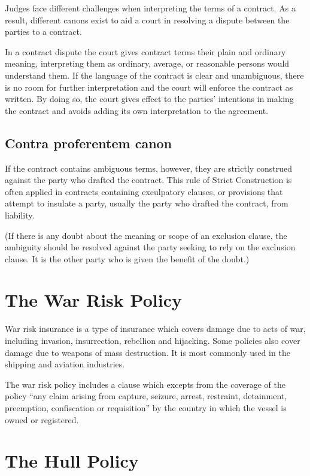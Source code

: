 
Judges face different challenges when interpreting the terms of a contract. As a result, different canons exist to aid a court in resolving a dispute between the parties to a contract.

In a contract dispute the court gives contract terms their plain and ordinary meaning, interpreting them as ordinary, average, or reasonable persons would understand them. If the language of the contract is clear and unambiguous, there is no room for further interpretation and the court will enforce the contract as written. By doing so, the court gives effect to the parties' intentions in making the contract and avoids adding its own interpretation to the agreement.


\subsection{Contra proferentem canon}
If the contract contains ambiguous terms, however, they are strictly construed against the party who drafted the contract. This rule of Strict Construction is often applied in contracts containing exculpatory clauses, or provisions that attempt to insulate a party, usually the party who drafted the contract, from liability.

(If there is any doubt about the meaning or scope of an exclusion clause, the ambiguity should be resolved against the party seeking to rely on the exclusion clause. It is the other party who is given the benefit of the doubt.)


\section{The War Risk Policy}

War risk insurance is a type of insurance which covers damage due to acts of war, including invasion, insurrection, rebellion and hijacking. Some policies also cover damage due to weapons of mass destruction. It is most commonly used in the shipping and aviation industries.

The war risk policy includes a clause which excepts from the coverage of the policy “any claim arising from capture, seizure, arrest, restraint, detainment, preemption, confiscation or requisition” by the country in which the vessel is owned or registered.

\section{The Hull Policy}

